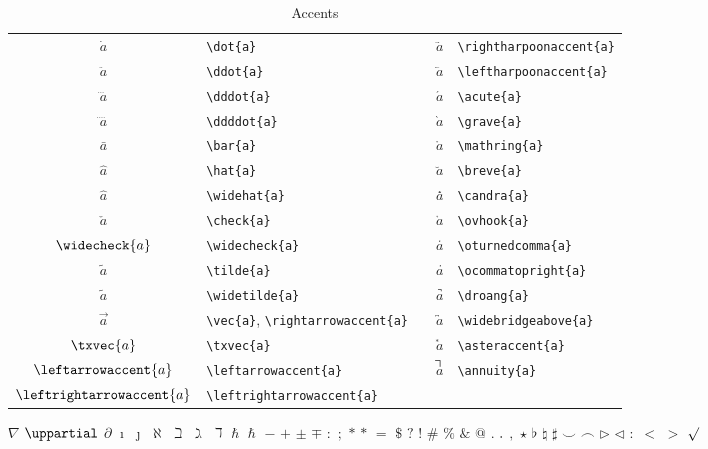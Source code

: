 \documentclass[captions=tableheading]{scrartcl}
\begin{document}
\begin{table}
  \caption{Accents}
  \label{tab:accents}
  \centering
  \begin{tabular}[c]{clp{1em}cl}
    \toprule
    $\dot{a}$ & \verb|\dot{a}| & &
    $\rightharpoonaccent{a}$ & \verb|\rightharpoonaccent{a}| \\
    $\ddot{a}$ & \verb|\ddot{a}| & &
    $\leftharpoonaccent{a}$ & \verb|\leftharpoonaccent{a}| \\
    $\dddot{a}$ & \verb|\dddot{a}| & &
    $\acute{a}$ & \verb|\acute{a}| \\
    $\ddddot{a}$ & \verb|\ddddot{a}| & &
    $\grave{a}$ & \verb|\grave{a}| \\
    $\bar{a}$ & \verb|\bar{a}| & &
    $\mathring{a}$ & \verb|\mathring{a}| \\
    \addlinespace
    $\hat{a}$ & \verb|\hat{a}| & &
    $\breve{a}$ & \verb|\breve{a}| \\
    $\widehat{a}$ & \verb|\widehat{a}| & &
    $\candra{a}$ & \verb|\candra{a}| \\
    $\check{a}$ & \verb|\check{a}| & &
    $\ovhook{a}$ & \verb|\ovhook{a}| \\
    $\widecheck{a}$ & \verb|\widecheck{a}| & &
    $\oturnedcomma{a}$ & \verb|\oturnedcomma{a}| \\
    $\tilde{a}$ & \verb|\tilde{a}| & &
    $\ocommatopright{a}$ & \verb|\ocommatopright{a}| \\
    $\widetilde{a}$ & \verb|\widetilde{a}| & &
    $\droang{a}$ & \verb|\droang{a}| \\
    \addlinespace
    $\vec{a}$ & \verb|\vec{a}|, \verb|\rightarrowaccent{a}| & &
    $\widebridgeabove{a}$ & \verb|\widebridgeabove{a}| \\
    $\txvec{a}$ & \verb|\txvec{a}| & &
    $\asteraccent{a}$ & \verb|\asteraccent{a}| \\
    $\leftarrowaccent{a}$ & \verb|\leftarrowaccent{a}| & &
    $\annuity{a}$ & \verb|\annuity{a}| \\
    $\leftrightarrowaccent{a}$ & \verb|\leftrightarrowaccent{a}| & &
    & \\
    \bottomrule
  \end{tabular}
\end{table}


$\nabla$
$\uppartial$
$\partial$
$\imath$
$\jmath$
$\aleph$
$\beth$
$\gimel$
$\daleth$
$\hbar$
$\hslash$
$-$
$+$
$\pm$
$\mp$
$:$
$;$
$*$
$\ast$
$=$
$\mathdollar$
$?$
$!$
$\#$
$\%$
$\&$
$@$
$.$
$\ldotp$
$,$
$\star$
$\flat$
$\natural$
$\sharp$
$\smile$
$\frown$
$\triangleright$
$\triangleleft$
$\colon$
$<$
$>$
$\surd$
\end{document}
